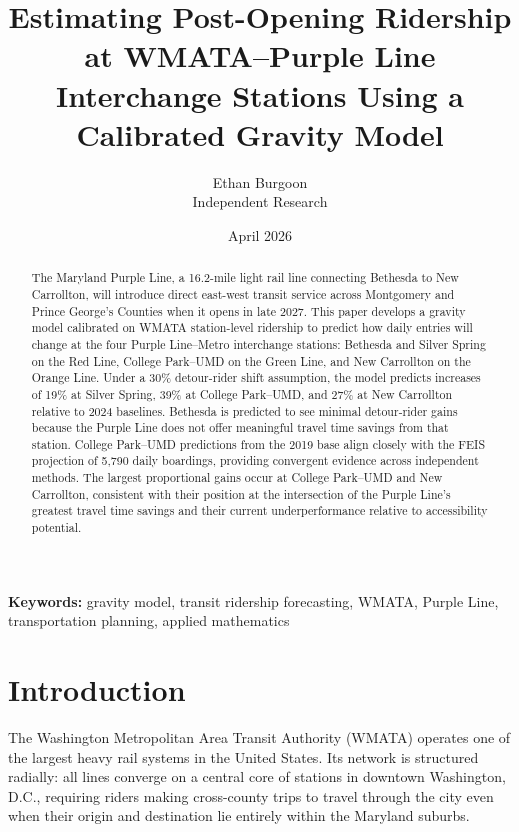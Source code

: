 \documentclass[11pt]{article}
\title{
    \textbf{Estimating Post-Opening Ridership at WMATA--Purple Line} \\
    \textbf{Interchange Stations Using a Calibrated Gravity Model}
}
\author{
    Ethan Burgoon \\
    \small Independent Research
}
\date{April 2026}
\begin{document}
\maketitle

\begin{abstract}
    The Maryland Purple Line, a 16.2-mile light rail line connecting Bethesda
    to New Carrollton, will introduce direct east-west transit service across
    Montgomery and Prince George's Counties when it opens in late 2027. This
    paper develops a gravity model calibrated on WMATA station-level ridership
    to predict how daily entries will change at the four Purple Line--Metro
    interchange stations: Bethesda and Silver Spring on the Red Line, College
    Park--UMD on the Green Line, and New Carrollton on the Orange Line. Under
    a 30\% detour-rider shift assumption, the model predicts increases of
    19\% at Silver Spring, 39\% at College Park--UMD, and 27\% at New
    Carrollton relative to 2024 baselines. Bethesda is predicted to see
    minimal detour-rider gains because the Purple Line does not offer
    meaningful travel time savings from that station. College Park--UMD
    predictions from the 2019 base align closely with the FEIS projection of
    5,790 daily boardings, providing convergent evidence across independent
    methods. The largest proportional gains occur at College Park--UMD and
    New Carrollton, consistent with their position at the intersection of the
    Purple Line's greatest travel time savings and their current
    underperformance relative to accessibility potential.
\end{abstract}

\vspace{1em}
\noindent\textbf{Keywords:} gravity model, transit ridership forecasting,
WMATA, Purple Line, transportation planning, applied mathematics

\newpage

\section{Introduction}
\label{sec:intro}

The Washington Metropolitan Area Transit Authority (WMATA) operates one of
the largest heavy rail systems in the United States. Its network is structured
radially: all lines converge on a central core of stations in downtown
Washington, D.C., requiring riders making cross-county trips to travel through
the city even when their origin and destination lie entirely within the
Maryland suburbs.
\end{document}
